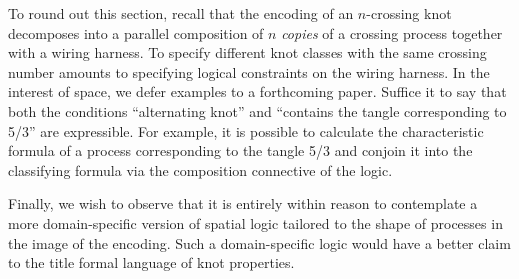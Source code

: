 To round out this section, recall that the encoding of an $n$-crossing
knot decomposes into a parallel composition of $n$ \emph{copies} of a
crossing process together with a wiring harness. To specify different
knot classes with the same crossing number amounts to specifying
logical constraints on the wiring harness. In the interest of space,
we defer examples to a forthcoming paper. Suffice it to say that both
the conditions ``alternating knot'' and ``contains the tangle
corresponding to 5/3'' are expressible. For example, it is possible to
calculate the characteristic formula of a process corresponding to the
tangle 5/3 and conjoin it into the classifying formula via the
composition connective of the logic.

Finally, we wish to observe that it is entirely within reason to
contemplate a more domain-specific version of spatial logic tailored
to the shape of processes in the image of the encoding. Such a
domain-specific logic would have a better claim to the title formal
language of knot properties.


